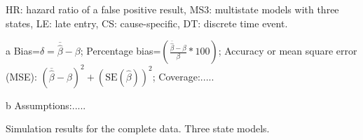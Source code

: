 \begin{table}[h!]
\begin{threeparttable}
\begin{tablenotes}
	\item HR: hazard ratio of a false positive result, MS3: multistate models with three states, LE: late entry, CS: cause-specific, DT: discrete time event.
	\item[a] Bias=$\delta=\overline{\hat\beta}-\beta$; Percentage bias=$\left(\frac{\overline{\hat\beta}-\beta}{\beta}*100 \right)$; Accuracy or mean square error (MSE): $(\overline{\hat\beta}-\beta)^2+(\mbox{SE}(\hat \beta))^2$; 	 Coverage:..... 
	\item[b] Assumptions:.....
\end{tablenotes}
\end{threeparttable}
\caption{Simulation results for the complete data. Three state models.}
\label{tab:HRFP_complete}
\end{table}



